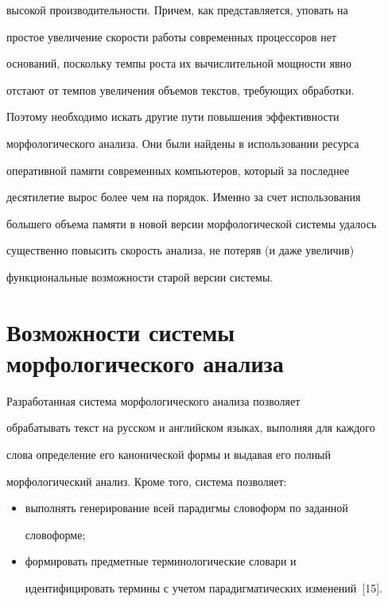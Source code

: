 высокой производительности. Причем, как представляется, уповать на

простое увеличение скорости работы современных процессоров нет

оснований, поскольку темпы роста их вычислительной мощности явно

отстают от темпов увеличения объемов текстов, требующих обработки.

Поэтому необходимо искать другие пути повышения эффективности

морфологического анализа. Они были найдены в использовании ресурса

оперативной памяти современных компьютеров, который за последнее

десятилетие вырос более чем на порядок. Именно за счет использования

большего объема памяти в новой версии морфологической системы удалось

существенно повысить скорость анализа, не потеряв (и даже увеличив)

функциональные возможности старой версии системы.



\section{Возможности системы морфологического анализа}





    Разработанная система морфологического анализа позволяет

обрабатывать текст на русском и английском языках, выполняя для каждого

слова определение его канонической формы и выдавая его полный

морфологический анализ. Кроме того, система позволяет:

    \begin{itemize}

\item выполнять генерирование всей парадигмы словоформ по заданной

слово\-форме;

\item формировать предметные терминологические словари и

идентифицировать термины с учетом парадигматических изменений~[15].

    \end{itemize}




